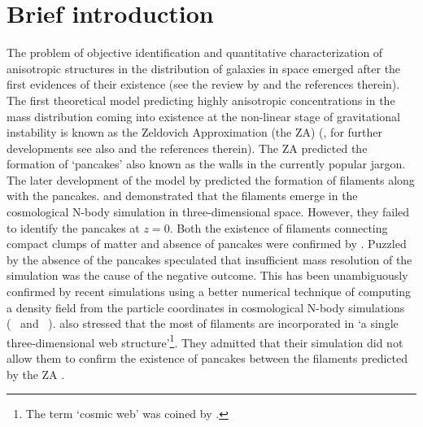 \section{Brief introduction} \label{sec:intro}



The problem of objective identification and quantitative characterization of anisotropic structures 
in the distribution of galaxies in space emerged after the first evidences of their existence
(see the review by \citealt{Oort1983} and the references therein). The first theoretical model predicting highly anisotropic concentrations in the mass distribution coming into existence at the non-linear stage of gravitational instability is known as the Zeldovich Approximation (the ZA) (\citealt{Zeldovich1970}, for further developments see also \citealt{Shandarin1989} and the references therein). The ZA predicted the formation of  `pancakes'  also known as the walls in the currently popular jargon. The later development
of the model by \citet{Arnold1982} predicted the formation of filaments along with the pancakes. \citet{Klypin1983a} and \citet{Shandarin1984} demonstrated that the filaments emerge in the cosmological N-body simulation in three-dimensional space.
However, they failed to identify the pancakes at $z=0$. Both the existence of filaments connecting compact clumps of matter and absence of pancakes were confirmed by \citet{Frenk1983}. Puzzled by the absence of the pancakes \citet{Klypin1983a}
speculated that insufficient mass resolution of the simulation was the cause  of the negative outcome. 
This has been unambiguously confirmed by recent simulations using a better numerical technique of computing a density field from the particle
coordinates in cosmological N-body simulations (~\citealt{Shandarin2012} and ~\citealt{Abel2012}). \citealt{Klypin1983a} 
also stressed that the most of filaments are  incorporated in 
`a single three-dimensional web structure'\footnote{The term `cosmic web' was coined by  \citet{Bond1996}.}. 
They admitted that
their simulation did not allow them to confirm the existence of pancakes between the filaments predicted by the ZA \citep{Arnold1982}.

